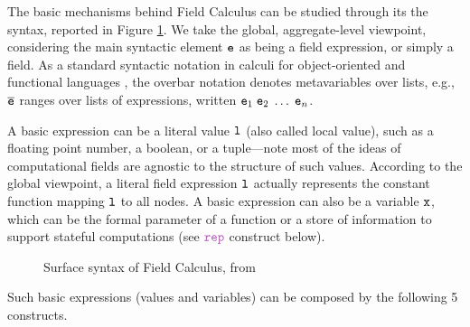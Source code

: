\documentclass[12pt,a4paper,twoside,openright]{book}
\begin{document}
The basic mechanisms behind Field Calculus can be studied through its the syntax, reported in Figure \ref{fig:source:syntax}.
%
We take the global, aggregate-level viewpoint, considering the main syntactic element $\texttt{e}$ as being a field expression, or simply a field.
%
As a standard syntactic notation in calculi for object-oriented and functional languages \cite{FJ}, the overbar notation denotes metavariables over lists, e.g., $\overline {\texttt{e}}$ ranges over lists
of expressions, written $\texttt{e}_1\;\texttt{e}_2\;\ldots\;\texttt{e}_n$.

A basic expression can be a literal value $\texttt{l}$ (also called local value), such as a floating point number, a boolean, or a tuple---note most of the ideas of computational fields are agnostic to the
structure of such values.
%
According to the global viewpoint, a literal field expression $\texttt{l}$ actually represents the constant function mapping $\texttt{l}$ to all nodes.
%
A basic expression can also be a variable $\texttt{x}$, which can be the formal parameter of a function or a store of information to support stateful computations (see $\repN$ construct below).

\begin{figure}[!t]{
\centerline{}}
\caption{Surface syntax of Field Calculus, from \cite{VDB-FOCLASA-CIC2013}}
\label{fig:source:syntax}
\end{figure}

Such basic expressions (values and variables) can be composed by the following 5 constructs.
\end{document}
